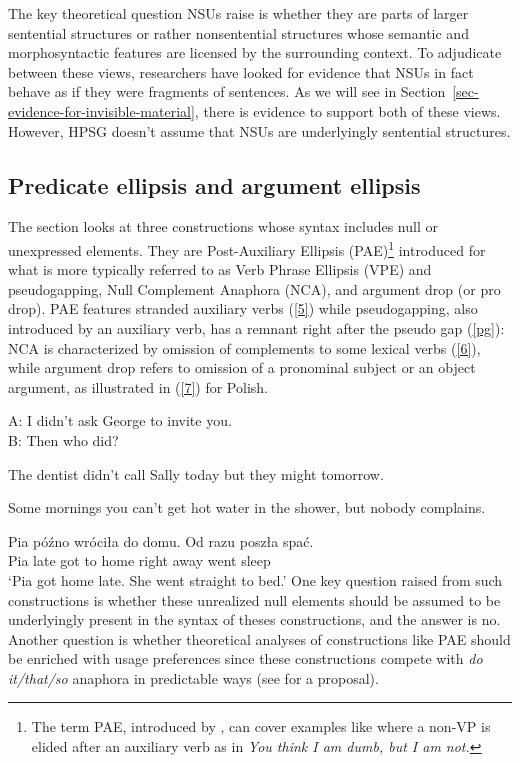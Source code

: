 {The key theoretical question NSUs raise is whether they are parts of larger sentential structures or rather nonsentential structures whose semantic and morphosyntactic features are licensed by the surrounding context. To adjudicate between these views, researchers have looked for evidence that NSUs in fact behave as if they were fragments of sentences. As we will see in Section~\ref{sec-evidence-for-invisible-material}, there is evidence to support both of these views. However, HPSG doesn't assume that NSUs are underlyingly sentential structures.

\subsection{Predicate ellipsis and argument ellipsis}
The section looks at three constructions whose syntax includes null or unexpressed elements. They are Post-Auxiliary Ellipsis (PAE)\footnote{The term PAE, introduced by \citealt{Sag1976}, can cover examples like where a non-VP is
elided after an auxiliary verb as in \emph{You think
I am dumb, but I am not.}}  introduced for what is more typically referred to as Verb Phrase Ellipsis (VPE) and pseudogapping, Null Complement Anaphora (NCA), and argument drop (or pro drop). PAE features stranded auxiliary verbs (\ref{5}) while pseudogapping, also introduced by an auxiliary verb,
has a remnant right after the pseudo gap (\ref{pg}):
%
%
%
%
 NCA is characterized by omission of complements to some lexical verbs (\ref{6}), while argument drop refers to omission of a pronominal subject or an object argument, as illustrated in (\ref{7}) for Polish.

\ea A: I didn't ask George to invite you.\\B: Then who did?\label{5}\z

\ea The dentist didn't call Sally today but they might tomorrow. \label{pg}\z

\ea Some mornings you can't get hot water in the shower, but nobody complains. \label{6} \z

\ea
\gll Pia p\'{o}\'{z}no wr\'{o}ci\l a do domu. Od razu posz\l a spa\'{c}.\\
Pia late got to home right away went sleep\\
\glt `Pia got home late. She went straight to bed.'
\label{7}
\z
%
One key question raised from such constructions
 is whether these unrealized null elements should be assumed to be underlyingly present in the syntax of theses constructions, and the answer is no. Another question is whether theoretical analyses of constructions like PAE should be enriched with usage preferences since these constructions compete with \textit{do it/that/so} anaphora in predictable ways (see \citealt{Miller2011} for a proposal).


}
